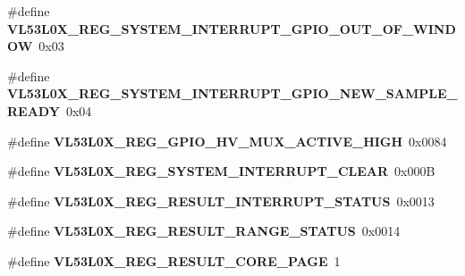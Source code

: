 \begin{DoxyCompactItemize}
\item 
\mbox{\label{group__VL53L0X__DefineRegisters__group_ga84466f853b4b005accfd4880c219e963}} 
\#define {\bfseries V\+L53\+L0\+X\+\_\+\+R\+E\+G\+\_\+\+S\+Y\+S\+T\+E\+M\+\_\+\+I\+N\+T\+E\+R\+R\+U\+P\+T\+\_\+\+G\+P\+I\+O\+\_\+\+O\+U\+T\+\_\+\+O\+F\+\_\+\+W\+I\+N\+D\+OW}~0x03
\item 
\mbox{\label{group__VL53L0X__DefineRegisters__group_gac494308aafc7f7a3c07e9dfd1776dae1}} 
\#define {\bfseries V\+L53\+L0\+X\+\_\+\+R\+E\+G\+\_\+\+S\+Y\+S\+T\+E\+M\+\_\+\+I\+N\+T\+E\+R\+R\+U\+P\+T\+\_\+\+G\+P\+I\+O\+\_\+\+N\+E\+W\+\_\+\+S\+A\+M\+P\+L\+E\+\_\+\+R\+E\+A\+DY}~0x04
\item 
\mbox{\label{group__VL53L0X__DefineRegisters__group_gaeb245edc08b44ccb9ffceb3a661dee54}} 
\#define {\bfseries V\+L53\+L0\+X\+\_\+\+R\+E\+G\+\_\+\+G\+P\+I\+O\+\_\+\+H\+V\+\_\+\+M\+U\+X\+\_\+\+A\+C\+T\+I\+V\+E\+\_\+\+H\+I\+GH}~0x0084
\item 
\mbox{\label{group__VL53L0X__DefineRegisters__group_gabb9c3a1aa62ce43de97229eb083f63e6}} 
\#define {\bfseries V\+L53\+L0\+X\+\_\+\+R\+E\+G\+\_\+\+S\+Y\+S\+T\+E\+M\+\_\+\+I\+N\+T\+E\+R\+R\+U\+P\+T\+\_\+\+C\+L\+E\+AR}~0x000B
\item 
\mbox{\label{group__VL53L0X__DefineRegisters__group_gafd468bf606197a89503bfa69533c46ae}} 
\#define {\bfseries V\+L53\+L0\+X\+\_\+\+R\+E\+G\+\_\+\+R\+E\+S\+U\+L\+T\+\_\+\+I\+N\+T\+E\+R\+R\+U\+P\+T\+\_\+\+S\+T\+A\+T\+US}~0x0013
\item 
\mbox{\label{group__VL53L0X__DefineRegisters__group_gae1c3e69963f637d139084984c869c23c}} 
\#define {\bfseries V\+L53\+L0\+X\+\_\+\+R\+E\+G\+\_\+\+R\+E\+S\+U\+L\+T\+\_\+\+R\+A\+N\+G\+E\+\_\+\+S\+T\+A\+T\+US}~0x0014
\item 
\mbox{\label{group__VL53L0X__DefineRegisters__group_ga5ed62d33e4740d65050f7129975a59ac}} 
\#define {\bfseries V\+L53\+L0\+X\+\_\+\+R\+E\+G\+\_\+\+R\+E\+S\+U\+L\+T\+\_\+\+C\+O\+R\+E\+\_\+\+P\+A\+GE}~1
\item 

\end{DoxyCompactItemize}
